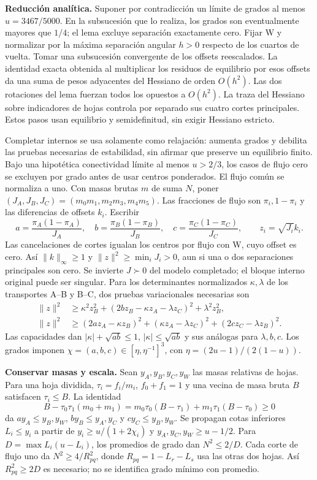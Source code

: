 \documentclass[10pt,a4paper]{article}
\begin{document}
\textbf{Reducción analítica.} Suponer por contradicción un límite de grados al menos $u=3467/5000$. En la subsucesión que lo realiza, los grados son eventualmente mayores que $1/4$; el lema excluye separación exactamente cero. Fijar W y normalizar por la máxima separación angular $h>0$ respecto de los cuartos de vuelta. Tomar una subsucesión convergente de los offsets reescalados. La identidad exacta obtenida al multiplicar los residuos de equilibrio por esos offsets da una suma de pesos adyacentes del Hessiano de orden $O(h^2)$. Las dos rotaciones del lema fuerzan todos los opuestos a $O(h^2)$. La traza del Hessiano sobre indicadores de hojas controla por separado sus cuatro cortes principales. Estos pasos usan equilibrio y semidefinitud, sin exigir Hessiano estricto.

Completar internos se usa solamente como relajación: aumenta grados y debilita las pruebas necesarias de estabilidad, sin afirmar que preserve un equilibrio finito. Bajo una hipotética conectividad límite al menos $u>2/3$, los casos de flujo cero se excluyen por grado antes de usar centros ponderados. El flujo común se normaliza a uno. Con masas brutas $m$ de suma $N$, poner $(J_A,J_B,J_C)=(m_0m_1,m_2m_3,m_4m_5)$. Las fracciones de flujo son $\pi_i,1-\pi_i$ y las diferencias de offsets $k_i$. Escribir
\[
 a=\frac{\pi_A(1-\pi_A)}{J_A},\quad
 b=\frac{\pi_B(1-\pi_B)}{J_B},\quad
 c=\frac{\pi_C(1-\pi_C)}{J_C},\qquad z_i=\sqrt{J_i}k_i.
\]
Las cancelaciones de cortes igualan los centros por flujo con W, cuyo offset es cero. Así $\|k\|_\infty\geq1$ y $\|z\|^2\geq\min_iJ_i>0$, aun si una o dos separaciones principales son cero. Se invierte $J\succ0$ del modelo completado; el bloque interno original puede ser singular. Para los determinantes normalizados $\kappa,\lambda$ de los transportes A--B y B--C, dos pruebas variacionales necesarias son
\[
\begin{aligned}
 \|z\|^2&\geq\kappa^2z_B^2+(2bz_B-\kappa z_A-\lambda z_C)^2+\lambda^2z_B^2,\\
 \|z\|^2&\geq(2az_A-\kappa z_B)^2+(\kappa z_A-\lambda z_C)^2+(2cz_C-\lambda z_B)^2.
\end{aligned}\tag{2}
\]
Las capacidades dan $|\kappa|+\sqrt{ab}\leq1$, $|\kappa|\leq\sqrt{ab}$ y sus análogas para $\lambda,b,c$. Los grados imponen $\chi=(a,b,c)\in[\eta,\eta^{-1}]^3$, con $\eta=(2u-1)/(2(1-u))$.

\textbf{Conservar masas y escala.} Sean $y_A,y_B,y_C,y_W$ las masas relativas de hojas. Para una hoja dividida, $\tau_i=f_i/m_i$, $f_0+f_1=1$ y una vecina de masa bruta $B$ satisfacen $\tau_i\leq B$. La identidad
\[
 B-\tau_0\tau_1(m_0+m_1)
 =m_0\tau_0(B-\tau_1)+m_1\tau_1(B-\tau_0)\geq0
\]
da $ay_A\leq y_B,y_W$, $by_B\leq y_A,y_C$ y $cy_C\leq y_B,y_W$. Se propagan cotas inferiores $L_i\leq y_i$ a partir de $y_i\geq u/(1+2\chi_i)$ y $y_A,y_C,y_W\geq u-1/2$. Para $D=\max L_i(u-L_i)$, los promedios de grado dan $N^2\leq2/D$. Cada corte de flujo uno da $N^2\geq4/R_{pq}^2$, donde $R_{pq}=1-L_r-L_s$ usa las otras dos hojas. Así $R_{pq}^2\geq2D$ es necesario; no se identifica grado mínimo con promedio.
\end{document}
